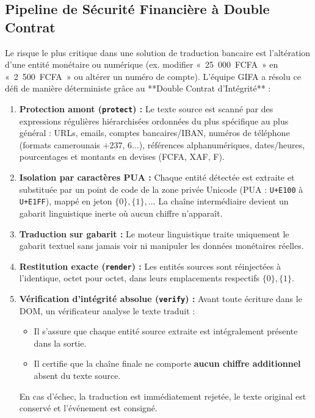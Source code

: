 \documentclass[10pt,a4paper]{article}
\begin{document}
\subsection{Pipeline de Sécurité Financière à Double Contrat}
Le risque le plus critique dans une solution de traduction bancaire est l'altération d'une entité monétaire ou numérique (ex. modifier «~25~000~FCFA~» en «~2~500~FCFA~» ou altérer un numéro de compte). L'équipe GIFA a résolu ce défi de manière déterministe grâce au **Double Contrat d'Intégrité** :

\begin{methodbox}
\small
\begin{enumerate}
  \item \textbf{Protection amont (\texttt{protect}) :} Le texte source est scanné par des expressions régulières hiérarchisées ordonnées du plus spécifique au plus général : URLs, emails, comptes bancaires/IBAN, numéros de téléphone (formats camerounais $+237$, $6\dots$), références alphanumériques, dates/heures, pourcentages et montants en devises (FCFA, XAF, F).
  \item \textbf{Isolation par caractères PUA :} Chaque entité détectée est extraite et substituée par un point de code de la zone privée Unicode (PUA : \texttt{U+E100} à \texttt{U+E1FF}), mappé en jeton $\{0\}, \{1\}, \dots$ La chaîne intermédiaire devient un gabarit linguistique inerte où aucun chiffre n'apparaît.
  \item \textbf{Traduction sur gabarit :} Le moteur linguistique traite uniquement le gabarit textuel sans jamais voir ni manipuler les données monétaires réelles.
  \item \textbf{Restitution exacte (\texttt{render}) :} Les entités sources sont réinjectées à l'identique, octet pour octet, dans leurs emplacements respectifs $\{0\}, \{1\}$.
  \item \textbf{Vérification d'intégrité absolue (\texttt{verify}) :} Avant toute écriture dans le DOM, un vérificateur analyse le texte traduit :
  \begin{itemize}
    \item Il s'assure que chaque entité source extraite est intégralement présente dans la sortie.
    \item Il certifie que la chaîne finale ne comporte \textbf{aucun chiffre additionnel} absent du texte source.
  \end{itemize}
  En cas d'échec, la traduction est immédiatement rejetée, le texte original est conservé et l'événement est consigné.
\end{enumerate}
\end{methodbox}
\end{document}
